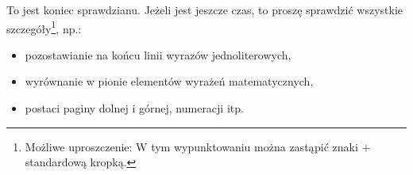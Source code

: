 \documentclass[a4paper,12pt]{article}
\begin{document}
        To jest koniec sprawdzianu. Jeżeli jest jeszcze czas, to proszę sprawdzić wszystkie szczegóły\footnote{
            Możliwe uproszczenie: W tym wypunktowaniu można zastąpić znaki $+$ standardową kropką.
        }, np.:
        \renewcommand{\labelitemi}{$+$}
        \begin{itemize}
            \item pozostawianie na końcu linii wyrazów jednoliterowych,
            \item wyrównanie w pionie elementów wyrażeń matematycznych,
            \item postaci paginy dolnej i górnej, numeracji itp.
        \end{itemize}
\end{document}
